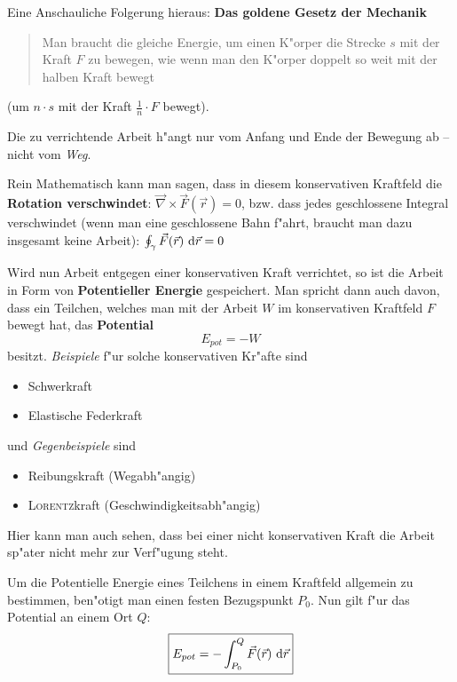 Eine Anschauliche Folgerung hieraus: \textbf{Das goldene Gesetz der
  Mechanik}
\begin{quote}
   Man braucht die gleiche Energie, um einen K"orper die Strecke $s$
   mit der Kraft $F$ zu bewegen, wie wenn man den K"orper doppelt so
   weit mit der halben Kraft bewegt
\end{quote}
(um $n \cdot s$ mit der Kraft $\frac{1}{n} \cdot F$ bewegt).



\begin{Def}
\label{def_konservative-kraft}
   Die zu verrichtende Arbeit h"angt nur vom Anfang und Ende der
   Bewegung ab -- nicht vom \emph{Weg}. 

   Rein Mathematisch kann man sagen, dass in diesem konservativen Kraftfeld die
   \textbf{Rotation verschwindet}: $\vec \nabla \times \Vec F(\Vec r) = 0$,
   bzw. dass jedes geschlossene Integral verschwindet (wenn man eine
   geschlossene Bahn f"ahrt, braucht man dazu insgesamt keine Arbeit):
   $\oint_\gamma \Vec F(\Vec r) \, \, \mathrm{d} \Vec r = 0$
\end{Def}

Wird nun Arbeit entgegen einer konservativen Kraft verrichtet, so ist
die Arbeit in Form von \textbf{Potentieller Energie} gespeichert. Man spricht dann auch davon, dass ein Teilchen,
welches man mit der Arbeit $W$ im konservativen Kraftfeld $F$ bewegt
hat, das \textbf{Potential} 
\begin{equation}
   \label{eqn_potential}
     E_{pot} = -W
\end{equation}
besitzt.
\emph{Beispiele} f"ur solche konservativen Kr"afte sind
\begin{itemize}
\item Schwerkraft
\item Elastische Federkraft
\end{itemize}
und \emph{Gegenbeispiele} sind
\begin{itemize}
\item Reibungskraft (Wegabh"angig)
\item \textsc{Lorentz}kraft (Geschwindigkeitsabh"angig)
\end{itemize}
Hier kann man auch sehen, dass bei einer nicht konservativen Kraft
die Arbeit sp"ater nicht mehr zur Verf"ugung steht.

\begin{Def}
   \label{def_potentielle_energie} 
   Um die Potentielle Energie eines Teilchens in einem Kraftfeld
   allgemein zu bestimmen, ben"otigt man einen festen Bezugspunkt
   $P_0$. Nun gilt f"ur das Potential an einem Ort $Q$:
\begin{equation}
   \label{eqn_potential_allgemein}
   \boxed{E_{pot} = - \int_{P_0}^Q \Vec F(\Vec r) \, \, \mathrm{d} \Vec r}
\end{equation}   
\end{Def}

